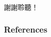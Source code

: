 \documentclass[mathserif]{beamer}
\begin{document}
    \begin{frame}
        \begin{center}
            \Large
            謝謝聆聽！
        \end{center}    
    \end{frame}

    \appendix
    \begin{frame}[allowframebreaks]
            \frametitle{References}
            
            
    \end{frame}
\end{document}
